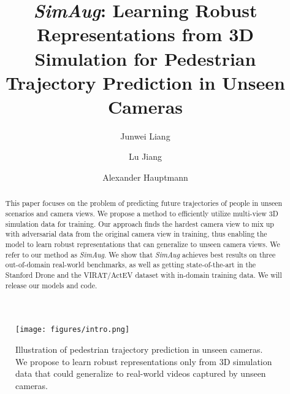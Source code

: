 \documentclass[runningheads]{eccv2020/llncs}
\newcommand{\fancyname}{SimAug}
\begin{document}
\pagestyle{headings}
\mainmatter
\def\ECCVSubNumber{1850}  

\title{\textit{\fancyname}: Learning Robust Representations from 3D Simulation for Pedestrian Trajectory Prediction in Unseen Cameras} 

\begin{comment}
\titlerunning{ECCV-20 submission ID \ECCVSubNumber} 
\authorrunning{ECCV-20 submission ID \ECCVSubNumber} 
\author{Anonymous ECCV submission}
\institute{Paper ID \ECCVSubNumber}
\end{comment}
\titlerunning{\textit{\fancyname}}
\author{Junwei Liang \and Lu Jiang \and
Alexander Hauptmann}
\maketitle



\begin{figure}[ht]
	\vspace{-6mm}
	\centering
		\texttt{[image: figures/intro.png]}
	\caption{Illustration of pedestrian trajectory prediction in unseen cameras. We propose to learn robust representations only from 3D simulation data that could generalize to real-world videos captured by unseen cameras.}
	\label{fig:intro}
	\vspace{-6mm}
\end{figure}

\begin{abstract}
This paper focuses on the problem of predicting future trajectories of people in unseen scenarios and camera views.
We propose a method to efficiently utilize multi-view 3D simulation data for training.
Our approach finds the hardest camera view to mix up with adversarial data from the original camera view in training, thus enabling the model to learn robust representations that can generalize to unseen camera views.
We refer to our method as \textit{\fancyname}. 
We show that \textit{\fancyname} achieves best results on three out-of-domain real-world benchmarks, as well as getting state-of-the-art in the Stanford Drone and the VIRAT/ActEV dataset with in-domain training data.
We will release our models and code.

\end{abstract} 
\end{document}
